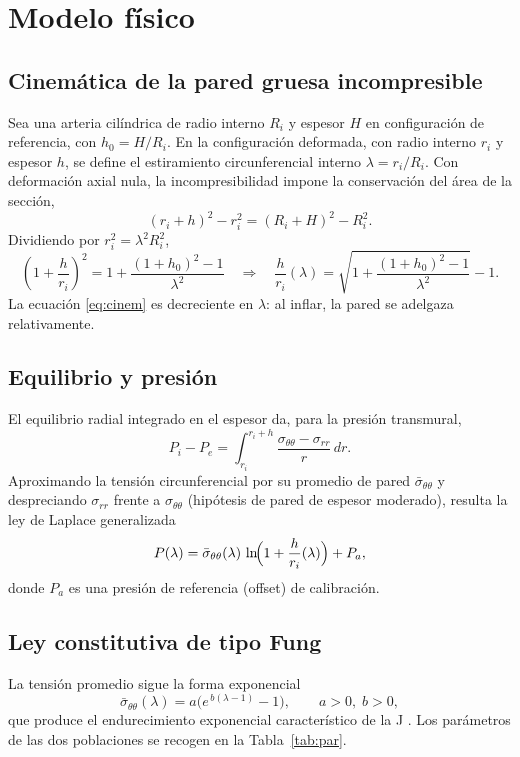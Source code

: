 \documentclass[11pt,twoside]{article}
\theoremstyle{definition}
\theoremstyle{remark}
\begin{document}
\section{Modelo físico}\label{sec:fisica}
\subsection{Cinemática de la pared gruesa incompresible}
Sea una arteria cilíndrica de radio interno $R_i$ y espesor $H$ en configuración de referencia, con $h_0=H/R_i$. En la configuración deformada, con radio interno $r_i$ y espesor $h$, se define el estiramiento circunferencial interno $\lambda=r_i/R_i$. Con deformación axial nula, la incompresibilidad impone la conservación del área de la sección,
\begin{equation}
 (r_i+h)^2-r_i^2=(R_i+H)^2-R_i^2 .
\end{equation}
Dividiendo por $r_i^2=\lambda^2R_i^2$,
\begin{equation}
 \left(1+\frac{h}{r_i}\right)^{2}=1+\frac{(1+h_0)^2-1}{\lambda^{2}}
 \quad\Longrightarrow\quad
 \frac{h}{r_i}(\lambda)=\sqrt{1+\frac{(1+h_0)^2-1}{\lambda^2}}-1 .
 \label{eq:cinem}
\end{equation}
La ecuación \eqref{eq:cinem} es decreciente en $\lambda$: al inflar, la pared se adelgaza relativamente.

\subsection{Equilibrio y presión}
El equilibrio radial integrado en el espesor da, para la presión transmural,
\begin{equation}
 P_i-P_e=\int_{r_i}^{r_i+h}\frac{\sigma_{\theta\theta}-\sigma_{rr}}{r}\,dr .
\end{equation}
Aproximando la tensión circunferencial por su promedio de pared $\bar\sigma_{\theta\theta}$ y despreciando $\sigma_{rr}$ frente a $\sigma_{\theta\theta}$ (hipótesis de pared de espesor moderado), resulta la ley de Laplace generalizada
\begin{equation}
 P(\lambda)=\bar\sigma_{\theta\theta}(\lambda)\,\ln\!\Bigl(1+\frac{h}{r_i}(\lambda)\Bigr)+P_a ,
 \label{eq:laplace}
\end{equation}
donde $P_a$ es una presión de referencia (offset) de calibración.

\subsection{Ley constitutiva de tipo Fung}
La tensión promedio sigue la forma exponencial
\begin{equation}
 \bar\sigma_{\theta\theta}(\lambda)=a\bigl(e^{\,b(\lambda-1)}-1\bigr),\qquad a>0,\; b>0,
 \label{eq:fung}
\end{equation}
que produce el endurecimiento exponencial característico de la J \cite{Fung1967}. Los parámetros de las dos poblaciones se recogen en la Tabla~\ref{tab:par}.
\end{document}

